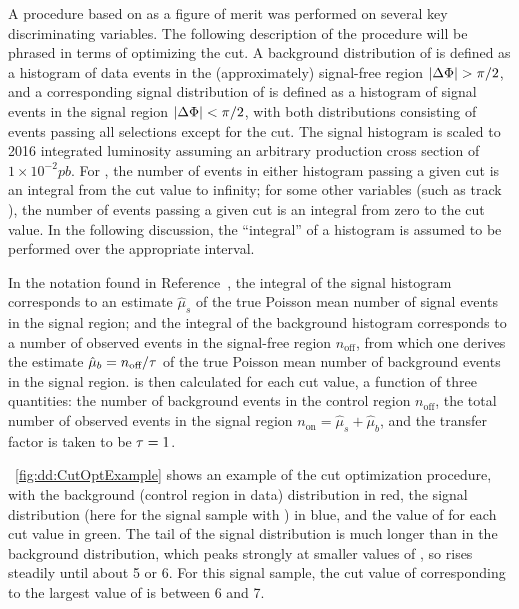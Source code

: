 A procedure based on \ZBi as a figure of merit was performed on several key discriminating variables.
The following description of the procedure will be phrased in terms of optimizing the \LxySig cut.
A background distribution of \LxySig is defined as a histogram of data events in the (approximately) signal-free region $|\Delta\Phi| > \pi/2$, and a corresponding signal distribution of \LxySig is defined as a histogram of signal events in the signal region \mbox{$|\Delta\Phi| < \pi/2$}, with both distributions consisting of events passing all selections except for the \LxySig cut.
The signal histogram is scaled to 2016 integrated luminosity assuming an arbitrary production cross section of $1\times 10^{-2}\unit{pb}$.
For \LxySig, the number of events in either histogram passing a given cut is an integral from the cut value to infinity; for some other variables (such as track \normchisq), the number of events passing a given cut is an integral from zero to the cut value.
In the following discussion, the ``integral'' of a histogram is assumed to be performed over the appropriate interval.

In the notation found in Reference~\cite{Cousins:ZBi2008}, the integral of the signal histogram corresponds to an estimate $\hat{\mu}_s$ of the true Poisson mean number of signal events in the signal region;
and the integral of the background histogram corresponds to a number of observed events in the signal-free region $n_\text{off}$, from which one derives the estimate $\hat{\mu}_b = n_\text{off}/\tau$ of the true Poisson mean number of background events in the signal region.
\ZBi is then calculated for each cut value, a function of three quantities: the number of background events in the control region $n_\text{off}$, the total number of observed events in the signal region $n_\text{on} = \hat{\mu}_s + \hat{\mu}_b$, and the transfer factor is taken to be $\tau = 1$.

\Fig~\ref{fig:dd:CutOptExample} shows an example of the cut optimization procedure, with the background (control region in data) distribution in red, the signal distribution (here for the \twoMu signal sample with ) in blue, and the value of \ZBi for each cut value in green.
The tail of the signal distribution is much longer than in the background distribution, which peaks strongly at smaller values of \LxySig, so \ZBi rises steadily until about 5 or 6.
For this signal sample, the cut value of \LxySig corresponding to the largest value of \ZBi is between 6 and 7.

